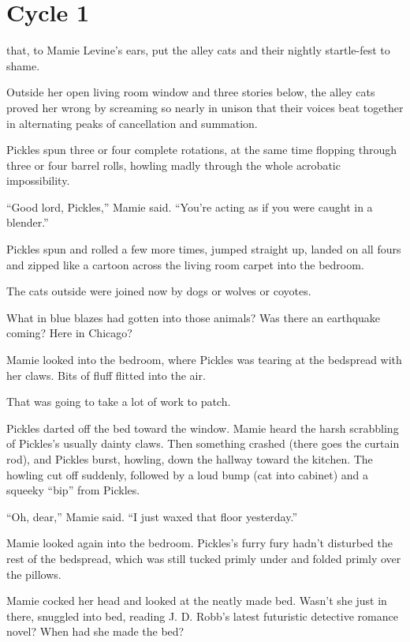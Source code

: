 \chapter{Cycle 1}


 that, to Mamie Levine’s ears, put the alley cats and their nightly startle-fest to shame.

Outside her open living room window and three stories below, the alley cats proved her wrong by screaming so nearly in unison that their voices beat together in alternating peaks of cancellation and summation.

Pickles spun three or four complete rotations, at the same time flopping through three or four barrel rolls, howling madly through the whole acrobatic impossibility.

“Good lord, Pickles,” Mamie said. “You’re acting as if you were caught in a blender.”

Pickles spun and rolled a few more times, jumped straight up, landed on all fours and zipped like a cartoon across the living room carpet into the bedroom.

The cats outside were joined now by dogs or wolves or coyotes.

What in blue blazes had gotten into those animals? Was there an earthquake coming? Here in Chicago?

Mamie looked into the bedroom, where Pickles was tearing at the bedspread with her claws. Bits of fluff flitted into the air.

That was going to take a lot of work to patch.

Pickles darted off the bed toward the window. Mamie heard the harsh scrabbling of Pickles’s usually dainty claws. Then something crashed (there goes the curtain rod), and Pickles burst, howling, down the hallway toward the kitchen. The howling cut off suddenly, followed by a loud bump (cat into cabinet) and a squeeky “bip” from Pickles.

“Oh, dear,” Mamie said. “I just waxed that floor yesterday.”

Mamie looked again into the bedroom. Pickles’s furry fury hadn’t disturbed the rest of the bedspread, which was still tucked primly under and folded primly over the pillows.

Mamie cocked her head and looked at the neatly made bed. Wasn’t she just in there, snuggled into bed, reading J. D. Robb’s latest futuristic detective romance novel? When had she made the bed?


